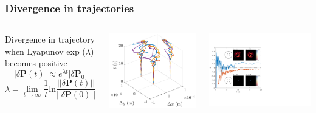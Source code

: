\documentclass{beamer}
\begin{document}
\begin{frame}
\frametitle{Divergence in trajectories}
\begin{columns}

Divergence in trajectory when Lyapunov exp ($\lambda$) becomes positive
$$
|\delta\mathbf{P}(t)| \approx e^{\lambda t} |\delta \mathbf{P}_0|
$$
$$
\lambda = \lim_{t\to\infty}\frac{1}{t}\text{ln}\frac{||\delta\textbf{P}(t)||}{||\delta\textbf{P}(0)||}
$$

\includegraphics[width=\textwidth]{../data/2d/evolution/evolution}

\includegraphics[width=\textwidth]{../data/2d/lyap/lyap}
\end{columns}
\end{frame}
\end{document}
